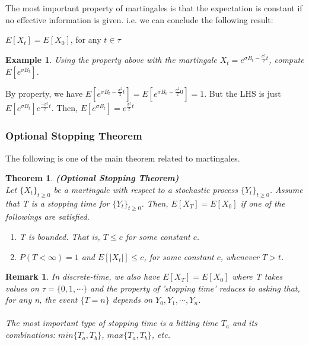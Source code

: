\documentclass[12pt]{article}
\newtheorem{theorem}{Theorem}
\newtheorem*{remark}{Remark}
\newtheorem{example}{Example}
\begin{document}
The most important property of martingales is that the expectation is constant if no effective information is given. i.e. we can conclude the following result:
\begin{center}
    $E[X_t] = E[X_0]$, for any $t \in \tau$
\end{center}

\begin{example}
    Using the property above with the martingale $X_t = e^{\sigma B_t - \frac{\sigma^2}{2}t}$, compute $E[e^{\sigma B_t}]$.
\end{example}

\noindent By property, we have $E[e^{\sigma B_t - \frac{\sigma^2}{2}t}] = E[e^{\sigma B_0 - \frac{\sigma^2}{2}0}] = 1$. But the LHS is just $E[e^{\sigma B_t}]e^{\frac{-\sigma^2}{2}t}$. Then, $E[e^{\sigma B_t}] = e^{\frac{\sigma^2}{2}t}$

\subsubsection{Optional Stopping Theorem}

The following is one of the main theorem related to martingales.
\begin{theorem}
    \textbf{(Optional Stopping Theorem)}
    \\Let $\{X_t\}_{t \geq 0}$ be a martingale with respect to a stochastic process $\{Y_t\}_{t \geq 0}$. Assume that T is a stopping time for $\{Y_t\}_{t \geq 0}$. Then, $E[X_T] = E[X_0]$ if one of the followings are satisfied.
    \begin{enumerate}
        \item T is bounded. That is, $T \leq c$ for some constant $c$.
        \item $P(T < \infty) = 1$ and $E[|X_t|] \leq c$, for some constant $c$, whenever $T > t$.
    \end{enumerate}
\end{theorem}

\begin{remark}
    In discrete-time, we also have $E[X_T] = E[X_0]$ where T takes values on $\tau = \{0,1, \cdots\}$ and the property of 'stopping time' reduces to asking that, for any n, the event $\{T = n\}$ depends on $Y_0, Y_1, \cdots, Y_n$.
    \\
    \\The most important type of stopping time is a hitting time $T_a$ and its combinations: $min\{T_a, T_b\}$, $max\{T_a, T_b\}$, etc.
\end{remark}
\end{document}
